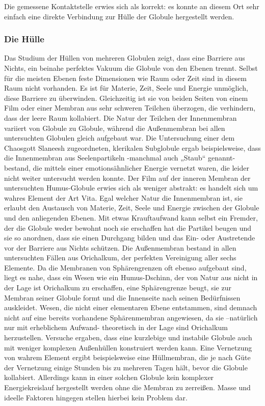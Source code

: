 \documentclass[a5paper,8pt]{book}
\begin{document}
Die gemessene Kontaktstelle erwies sich als korrekt: es konnte an diesem Ort sehr einfach eine direkte Verbindung zur Hülle 
der Globule hergestellt werden.

\subsubsection{Die Hülle}
Das Studium der Hüllen von mehreren Globulen zeigt, dass eine Barriere aus Nichts, ein beinahe perfektes Vakuum die Globule 
von den Ebenen trennt. Selbst für die meisten Ebenen feste Dimensionen wie Raum oder Zeit sind in diesem Raum nicht 
vorhanden. Es ist für Materie, Zeit, Seele und Energie unmöglich, diese Barriere zu überwinden. Gleichzeitig ist sie von 
beiden Seiten von einem Film oder einer Membran aus sehr schweren Teilchen überzogen, die verhindern, dass der leere Raum 
kollabiert. Die Natur der Teilchen der Innenmembran variiert von Globule zu Globule, während die Außenmembran bei allen 
untersuchten Globulen gleich aufgebaut war. 
Die Untersuchung einer dem Chaosgott Slaneesh zugeordneten, klerikalen Subglobule ergab beispielsweise, dass die 
Innenmembran aus Seelenpartikeln -manchmal auch „Staub“ genannt- bestand, die mittels einer emotionsähnlicher Energie 
vernetzt waren, die leider nicht weiter untersucht werden konnte. 
Der Film auf der inneren Membran der untersuchten Humus-Globule erwies sich als weniger abstrakt: es handelt sich um wahres 
Element der Art Vita. 
Egal welcher Natur die Innenmembran ist, sie erlaubt den Austausch von Materie, Zeit, Seele und Energie zwischen der Globule 
und den anliegenden Ebenen. Mit etwas Krauftaufwand kann selbst ein Fremder, der die Globule weder bewohnt noch sie erschaffen 
hat die Partikel beugen und sie so anordnen, dass sie einen Durchgang bilden und das Ein- oder Austretende vor der Barriere 
aus Nichts schützen. 
Die Außenmembran bestand in allen untersuchten Fällen aus Orichalkum, der perfekten Vereinigung aller sechs Elemente. Da die 
Membranen von Sphärengrenzen oft ebenso aufgebaut sind, liegt es nahe, dass ein Wesen wie ein Humus-Dschinn, der von Natur 
aus nicht in der Lage ist Orichalkum zu erschaffen, eine Sphärengrenze beugt, sie zur Membran seiner Globule formt und die 
Innenseite nach seinen Bedürfnissen auskleidet. Wesen, die nicht einer elementaren Ebene entstammen, sind demnach nicht auf 
eine bereits vorhandene Sphärenmembran angewiesen, da sie –natürlich nur mit erheblichem Aufwand- theoretisch in der Lage 
sind Orichalkum herzustellen.
Versuche ergaben, dass eine kurzlebige und instabile Globule auch mit weniger komplexen Außenhüllen konstruiert werden kann. 
Eine Vernetzung von wahrem Element ergibt beispielsweise eine Hüllmembran, die je nach Güte der Vernetzung einige Stunden 
bis zu mehreren Tagen hält, bevor die Globule kollabiert. Allerdings kann in einer solchen Globule kein komplexer 
Energiekreislauf hergestellt werden ohne die Membran zu zerreißen. Masse und ideelle Faktoren hingegen stellen hierbei kein Problem dar. 
\end{document}
